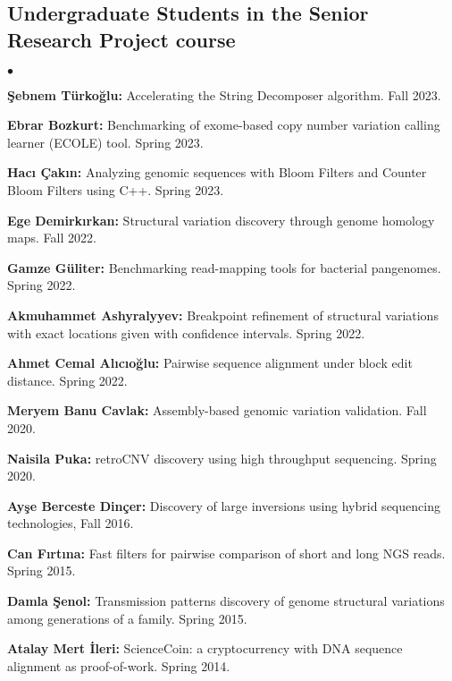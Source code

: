\documentclass[margin,line]{res}
\newenvironment{list2}{
  \begin{list}{$\bullet$}{%
      \setlength{\itemsep}{0.1cm}
      \setlength{\parsep}{0in} \setlength{\parskip}{0in}
      \setlength{\topsep}{0in} \setlength{\partopsep}{0in} 
      \setlength{\leftmargin}{0.2in}}}{\end{list}}
\begin{document}
\begin{resume}
  \subsection{\small \sc Undergraduate Students in the Senior Research Project course}
  \begin{list2}
\item
    {\bf Şebnem Türkoğlu:} Accelerating the String Decomposer algorithm. Fall 2023.
    \item
    {\bf Ebrar Bozkurt:} Benchmarking of exome-based copy number variation calling learner (ECOLE) tool. Spring 2023.
\item
    {\bf Hacı Çakın:} Analyzing genomic sequences with Bloom
Filters and Counter Bloom Filters using C++. Spring 2023.
   \item \textbf{Ege Demirkırkan:} Structural variation discovery through genome homology maps. Fall 2022.
   \item \textbf{Gamze Güliter:} Benchmarking read-mapping tools for bacterial pangenomes. Spring 2022.
 \item \textbf{Akmuhammet Ashyralyyev:} Breakpoint refinement of structural variations with exact locations given with confidence intervals. Spring 2022.
 \item \textbf{Ahmet Cemal Alıcıoğlu:} Pairwise sequence alignment under block edit distance. Spring 2022.
\item 
  {\bf Meryem Banu Cavlak:} Assembly-based genomic variation validation. Fall 2020.
  \item
    {\bf Naisila Puka:} retroCNV discovery using high throughput sequencing. Spring 2020.
  \item
    {\bf Ayşe Berceste Dinçer:} Discovery of large inversions using hybrid sequencing technologies, Fall 2016.
  \item
    {\bf Can Fırtına:} Fast filters for pairwise comparison of short and long NGS reads. Spring 2015.
  \item
    {\bf Damla Şenol:} Transmission patterns discovery of genome structural variations among generations of a family. Spring 2015.
  \item
    {\bf Atalay Mert İleri:} ScienceCoin: a cryptocurrency with DNA sequence alignment as proof-of-work. Spring 2014.
  \end{list2}
\vspace*{-.4cm}

\end{resume}
\end{document}
